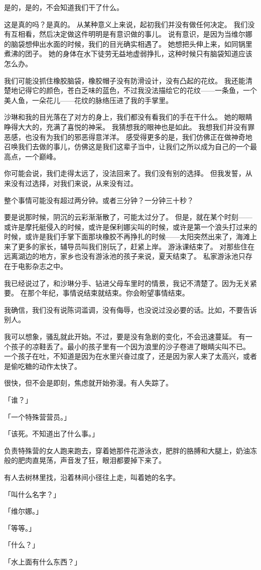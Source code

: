 \documentclass[UTF8]{ctexart}
\begin{document}
是的，是的，不会知道我们干了什么。

这是真的吗？是真的。
从某种意义上来说，起初我们并没有做任何决定。
我们没有互相看，然后决定做这件明明是有意识做的事儿。
说有意识，是因为当维尔娜的脑袋想伸出水面的时候，我们的目光确实相遇了。
她想把头伸上来，如同锅里煮沸的团子。
她的身体在水下徒劳无益地虚弱挣扎，这种时候只有脑袋知道应该怎么办。

我们可能没抓住橡胶脑袋，橡胶帽子没有防滑设计，没有凸起的花纹。
我还能清楚地记得它的颜色，苍白乏味的蓝色，不过我没法描绘它的花纹——一条鱼，一个美人鱼，一朵花儿——花纹的脉络压进了我的手掌里。

沙琳和我的目光落在了对方的身上，我们都没有看我们的手在干什么。
她的眼睛睁得大大的，充满了喜悦的神采。
我猜想我的眼神也是如此。
我想我们并没有罪恶感，也没有为我们的邪恶得意洋洋。
感受得更多的是，我们仿佛正在做神奇地召唤我们去做的事儿，仿佛这是我们这辈子当中，让我们之所以成为自己的一个最高点，一个巅峰。

你可能会说，我们走得太远了，没法回来了。我们没有别的选择。
但我发誓，从来没有过选择，对我们来说，从来没有过。

整个事情可能没有超过两分钟。或者三分钟？一分钟三十秒？

要是说那时候，阴沉的云彩渐渐散了，可能太过分了。
但是，就在某个时刻——或许是摩托艇侵入的时候，或许是保利娜尖叫的时候，或许是第一个浪头打过来的时候，或许是我们手掌下面那块橡胶不再挣扎的时候——太阳突然出来了，海滩上来了更多的家长，辅导员叫我们别玩了，赶紧上岸。
游泳课结束了。
对那些住在远离湖边的地方，家乡也没有游泳池的孩子来说，夏天结束了。
私家游泳池只存在于电影杂志之中。

我已经说过了，和沙琳分手、钻进父母车里时的情景，我记不清楚了。因为无关紧要。
在那个年纪，事情说结束就结束。你会盼望事情结束。

我确信，我们没有说陈词滥调，没有侮辱，也没说过没必要的话。比如，不要告诉别人。

我可以想象，骚乱就此开始。不过，要是没有急剧的变化，不会迅速蔓延。
有一个孩子的凉鞋丢了。最小的孩子里有一个因为浪里的沙子卷进了眼睛尖叫不已。
一个孩子在吐，不知道是因为在水里兴奋过度了，还是因为家人来了太高兴，或者是偷吃糖的动作太快了。

很快，但不会是即刻，焦虑就开始弥漫。有人失踪了。

「谁？」

「一个特殊营营员。」

「该死。不知道出了什么事。」

负责特殊营的女人跑来跑去，穿着她那件花游泳衣，肥胖的胳膊和大腿上，奶油冻般的肥肉直晃荡，声音发了狂，眼泪都要掉下来了。

有人去树林里找，沿着林间小径往上走，叫着她的名字。

「叫什么名字？」

「维尔娜。」

「等等。」

「什么？」

「水上面有什么东西？」
\end{document}
